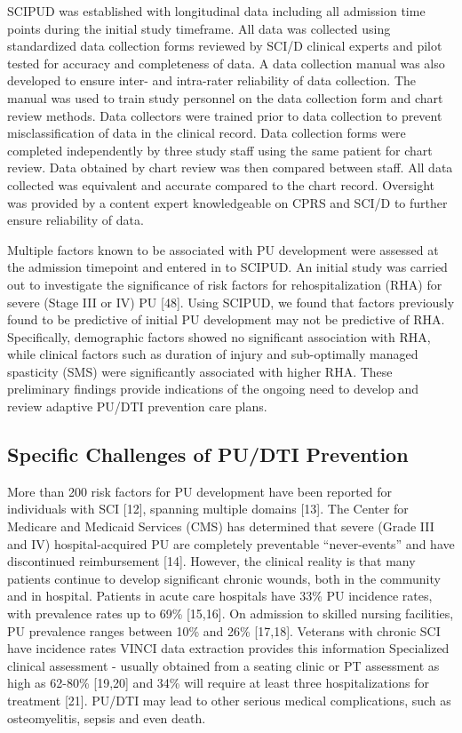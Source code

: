\documentclass{amia}
\begin{document}
SCIPUD was established with longitudinal data including all admission time points during the initial study timeframe. All data was collected using standardized data collection forms reviewed by SCI/D clinical experts and pilot tested for accuracy and completeness of data. A data collection manual was also developed to ensure inter- and intra-rater reliability of data collection. The manual was used to train study personnel on the data collection form and chart review methods. Data collectors were trained prior to data collection to prevent misclassification of data in the clinical record. Data collection forms were completed independently by three study staff using the same patient for chart review. Data obtained by chart review was then compared between staff. All data collected was equivalent and accurate compared to the chart record. Oversight was provided by a content expert knowledgeable on CPRS and SCI/D to further ensure reliability of data.

Multiple factors known to be associated with PU development were assessed at the admission timepoint and entered in to SCIPUD. An initial study was carried out to investigate the significance of risk factors for rehospitalization (RHA) for severe (Stage III or IV) PU [48]. Using SCIPUD, we found that factors previously found to be predictive of initial PU development may not be predictive of RHA. Specifically, demographic factors showed no significant association with RHA, while clinical factors such as duration of injury and sub-optimally managed spasticity (SMS) were significantly associated with higher RHA. These preliminary findings provide indications of the ongoing need to develop and review adaptive PU/DTI prevention care plans.

\subsection{Specific Challenges of PU/DTI Prevention}

More than 200 risk factors for PU development have been reported for individuals with SCI [12], spanning multiple domains [13]. The Center for Medicare and Medicaid Services (CMS) has determined that severe (Grade III and IV) hospital-acquired PU are completely preventable ``never-events'' and have discontinued reimbursement [14]. However, the clinical reality is that many patients continue to develop significant chronic wounds, both in the community and in hospital. Patients in acute care hospitals have 33\% PU incidence rates, with prevalence rates up to 69\% [15,16]. On admission to skilled nursing facilities, PU prevalence ranges between 10\% and 26\% [17,18]. Veterans with chronic SCI have incidence rates VINCI data extraction provides this information Specialized clinical assessment - usually obtained from a seating clinic or PT assessment as high as 62-80\% [19,20] and 34\% will require at least three hospitalizations for treatment [21]. PU/DTI may lead to other serious medical complications, such as osteomyelitis, sepsis and even death.
\end{document}
